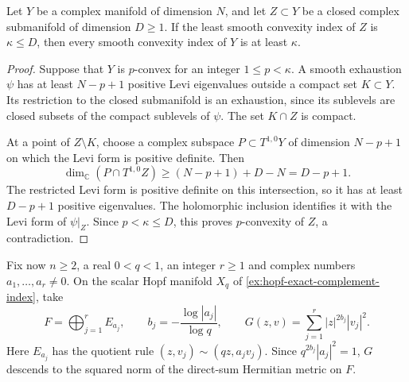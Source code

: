 \begin{lemma}\label{lem:closed-submanifold-complement-index-bound}
Let $Y$ be a complex manifold of dimension $N$, and let $Z\subset Y$ be a closed complex submanifold of dimension $D\geq1$. If the least smooth convexity index of $Z$ is $\kappa\leq D$, then every smooth convexity index of $Y$ is at least $\kappa$.
\end{lemma}
\begin{proof}
Suppose that $Y$ is $p$-convex for an integer $1\leq p<\kappa$. A smooth exhaustion $\psi$ has at least $N-p+1$ positive Levi eigenvalues outside a compact set $K\subset Y$. Its restriction to the closed submanifold is an exhaustion, since its sublevels are closed subsets of the compact sublevels of $\psi$. The set $K\cap Z$ is compact.

At a point of $Z\setminus K$, choose a complex subspace $P\subset T^{1,0}Y$ of dimension $N-p+1$ on which the Levi form is positive definite. Then
\[
 \dim_{\mathbb C}(P\cap T^{1,0}Z)\geq (N-p+1)+D-N=D-p+1.
\]
The restricted Levi form is positive definite on this intersection, so it has at least $D-p+1$ positive eigenvalues. The holomorphic inclusion identifies it with the Levi form of $\psi|_Z$. Since $p<\kappa\leq D$, this proves $p$-convexity of $Z$, a contradiction.
\end{proof}

Fix now $n\geq2$, a real $0<q<1$, an integer $r\geq1$ and complex numbers $a_1,\ldots,a_r\ne0$. On the scalar Hopf manifold $X_q$ of \cref{ex:hopf-exact-complement-index}, take
\[
 F=\bigoplus_{j=1}^r E_{a_j},\qquad
 b_j=-\frac{\log|a_j|}{\log q},\qquad
 G(z,v)=\sum_{j=1}^r |z|^{2b_j}|v_j|^2.
\]
Here $E_{a_j}$ has the quotient rule $(z,v_j)\sim(qz,a_jv_j)$. Since $q^{2b_j}|a_j|^2=1$, $G$ descends to the squared norm of the direct-sum Hermitian metric on $F$.


